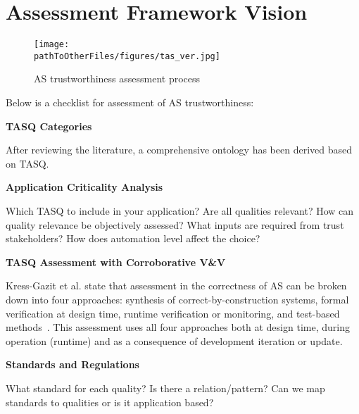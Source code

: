 \section{Assessment Framework Vision}\label{Assessment_Framework_Vision}

\begin{figure*}[]
    \centering
    \texttt{[image: \\pathToOtherFiles/figures/tas\_ver.jpg]}
    \caption{AS trustworthiness assessment process}
    \label{fig:tas_ver}
\end{figure*}

Below is a checklist for assessment of AS trustworthiness:

\noindent\textbf{TASQ Categories}

After reviewing the literature, a comprehensive ontology has been derived based on TASQ. 

\noindent\textbf{Application Criticality Analysis}

Which TASQ to include in your application? Are all qualities relevant? How can quality relevance be objectively assessed? What inputs are required from trust stakeholders? How does automation level affect the choice?    

\noindent\textbf{TASQ Assessment with Corroborative V\&V}


Kress-Gazit et al. state that assessment in the correctness of AS can be broken down into four approaches: synthesis of correct-by-construction systems, formal verification at design time, runtime verification or monitoring, and test-based methods~\cite{kress2021formalizing}. 
%
This assessment uses all four approaches both at design time, during operation (runtime) and as a consequence of development iteration or update. 



\noindent\textbf{Standards and Regulations}

What standard for each quality? Is there a relation/pattern? Can we map standards to qualities or is it application based? 


